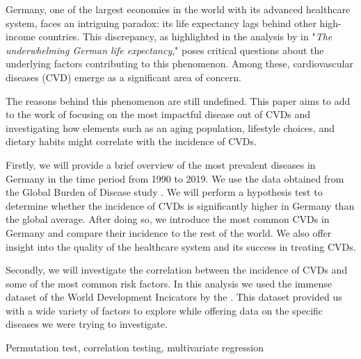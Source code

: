 Germany, one of the largest economies in the world with its advanced healthcare system, faces an intriguing paradox: 
its life expectancy lags behind other high-income countries. This discrepancy, as highlighted in the analysis 
by \citet{Jasilionis2023} in "\textit{The underwhelming German life expectancy}," poses critical questions about the 
underlying factors contributing to this phenomenon. Among these, cardiovascular diseases (CVD) emerge as a significant area of concern.

The reasons behind this phenomenon are still undefined. This paper aims to add to the work of \citet{Jasilionis2023} focusing on 
the most impactful disease out of CVDs and investigating how elements such as an aging population, lifestyle choices, and dietary habits 
might correlate with the incidence of CVDs. 

Firstly, we will provide a brief overview of the most prevalent diseases in Germany in the time period from 1990 to 2019. We use the data 
obtained from the Global Burden of Disease study \citep{GBD2019}. We will perform a hypothesis test to determine whether the incidence of
CVDs is significantly higher in Germany than the global average. After doing so, we introduce the most common CVDs in Germany and compare 
their incidence to the rest of the world. We also offer insight into the quality of the healthcare system and its success in treating CVDs.

Secondly, we will investigate the correlation between the incidence of CVDs and some of the most common risk factors. In this 
analysis we used the immense dataset of the World Development Incicators by the \citet{worldbank_wdi}. 
This dataset provided us with a wide variety of factors to explore while offering data on the specific diseases we were trying to investigate.

Permutation test, correlation testing, multivariate regression